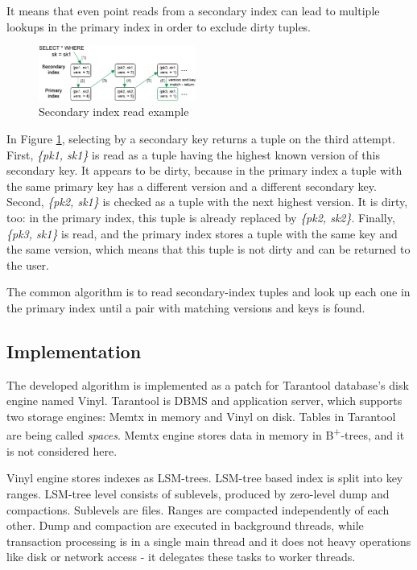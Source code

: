 \documentclass{vldb}
\begin{document}
It means that even point reads from a secondary index can lead to multiple
lookups in the primary index in order to exclude dirty tuples.
\begin{figure}
\centering
\includegraphics[width=0.46\textwidth]{secondary_reading_example}
\caption{Secondary index read example}
\label{fig:secondary_reading_example}
\end{figure}
In Figure \ref{fig:secondary_reading_example}, selecting by a secondary key
returns a tuple on the third attempt. First, \textit{\{pk1, sk1\}} is read as a tuple having
the highest known version of this secondary key. It appears to be dirty, because
in the primary index a tuple with the same primary key has a different version and
a different secondary key. Second, \textit{\{pk2, sk1\}} is checked as a tuple with
the next highest version. It is dirty, too: in the primary index, this tuple is already
replaced by \textit{\{pk2, sk2\}}. Finally, \textit{\{pk3, sk1\}} is read, and the
primary index stores a tuple with the same key and the same version, which means
that this tuple is not dirty and can be returned to the user.

The common algorithm is to read secondary-index tuples and look up each one in the
primary index until a pair with matching versions and keys is found.

\subsection{Implementation}

The developed algorithm is implemented as a patch for Tarantool database's disk
engine named Vinyl. Tarantool is DBMS and application server, which supports two
storage engines: Memtx in memory and Vinyl on disk. Tables in Tarantool are
being called \textit{spaces}. Memtx engine stores data in memory in
B\textsuperscript{+}-trees, and it is not considered here.

Vinyl engine stores indexes as LSM-trees. LSM-tree based index is split into key
ranges. LSM-tree level consists of sublevels, produced by zero-level dump and
compactions. Sublevels are files. Ranges are compacted independently of each
other. Dump and compaction are executed in background threads, while transaction
processing is in a single main thread and it does not heavy operations like disk
or network access - it delegates these tasks to worker threads.
\end{document}
